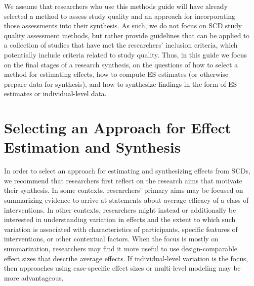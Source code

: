 \documentclass[
]{book}
\begin{document}
We assume that researchers who use this methods guide will have already selected a method to assess study quality and an approach for incorporating those assessments into their synthesis.
As such, we do not focus on SCD study quality assessment methods, but rather provide guidelines that can be applied to a collection of studies that have met the researchers' inclusion criteria, which potentially include criteria related to study quality.
Thus, in this guide we focus on the final stages of a research synthesis, on the questions of how to select a method for estimating effects, how to compute ES estimates (or otherwise prepare data for synthesis), and how to synthesize findings in the form of ES estimates or individual-level data.

\hypertarget{selecting-an-approach-for-effect-estimation-and-synthesis}{%
\section{Selecting an Approach for Effect Estimation and Synthesis}\label{selecting-an-approach-for-effect-estimation-and-synthesis}}

In order to select an approach for estimating and synthesizing effects from SCDs, we recommend that researchers first reflect on the research aims that motivate their synthesis.
In some contexts, researchers' primary aims may be focused on summarizing evidence to arrive at statements about average efficacy of a class of interventions.
In other contexts, researchers might instead or additionally be interested in understanding variation in effects and the extent to which such variation is associated with characteristics of participants, specific features of interventions, or other contextual factors.
When the focus is mostly on summarization, researchers may find it more useful to use design-comparable effect sizes that describe average effects.
If individual-level variation is the focus, then approaches using case-specific effect sizes or multi-level modeling may be more advantageous.
\end{document}
